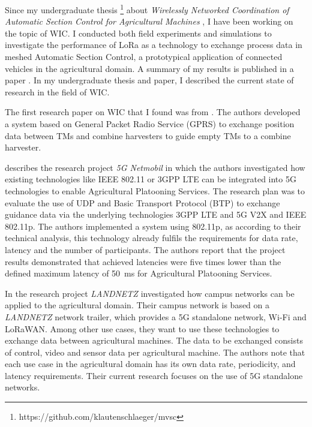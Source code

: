 Since my undergraduate thesis \footnote{https://github.com/klautenschlaeger/mvsc} about \textit{
Wirelessly Networked Coordination of Automatic Section Control for Agricultural Machines}
, I have been working on the topic of \ac{WIC}. I conducted both field experiments and
simulations to investigate the performance of LoRa as a technology to exchange process data in
meshed Automatic Section Control, a prototypical application of connected vehicles in the agricultural domain.
A summary of my results is published in a paper \cite{lautenschlaeger_beyond_2022}.
In my undergraduate thesis and paper, I described the current state of research in the field of WIC.

The first research paper on WIC that I found was from \textcite{ali_multi-agent_2010}. The authors
developed a system based on General Packet Radio Service (GPRS) to exchange position data between \ac{TM}s and combine
harvesters to guide empty \ac{TM}s to a combine harvester.

\textcite{smolnik_5g_2020} describes the research project \textit{5G Netmobil} in which the authors investigated how existing technologies like
IEEE 802.11 or 3GPP LTE can be integrated into 5G technologies to enable Agricultural Platooning Services. The research plan was to evaluate the use of \ac{UDP} and Basic Transport Protocol (BTP) to exchange guidance data via
the underlying technologies 3GPP LTE and 5G V2X and IEEE 802.11p. The authors implemented a system using 802.11p,
as according to their technical analysis, this technology already fulfils the requirements for data rate, latency
and the number of participants. The authors report that the project results demonstrated that achieved
latencies were five times lower than the defined maximum latency of \SI{50}{\milli\second} for Agricultural Platooning Services.

In the research project \textit{LANDNETZ} \textcite{hecker_aspects_2022} investigated how campus networks can be applied to the
agricultural domain.
Their campus network is based on a \textit{LANDNETZ} network trailer, which provides a 5G standalone network,
Wi-Fi and LoRaWAN.
Among other use cases, they want to use these technologies to exchange data between agricultural machines.
The data to be exchanged consists of control, video and sensor data per agricultural machine.
The authors note that each use case in the agricultural domain has its own data rate, periodicity,
and latency requirements.
Their current research focuses on the use of 5G standalone networks.

